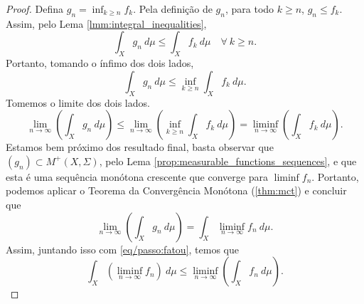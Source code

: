 \begin{proof}
    Defina $g_n=\inf_{k\geq n} f_k$. Pela definição de $g_n$, para todo $k\geq n$, $g_n\leq f_k$. Assim, pelo Lema \ref{lmm:integral_inequalities},
    \begin{equation*}
        \int_{X} g_n \ d\mu \leq \int_{X} f_k \ d\mu \quad \forall \ k\geq n.
    \end{equation*}
    Portanto, tomando o ínfimo dos dois lados,
    \begin{equation*}
        \int_{X} g_n \ d\mu \leq \inf_{k\geq n}\int_{X} f_k \ d\mu.
    \end{equation*}
    Tomemos o limite dos dois lados.
    \begin{equation}\label{eq/passo:fatou}
        \lim_{n\rightarrow \infty}\left(\int_{X} g_n \ d\mu\right) \leq \lim_{n\rightarrow \infty}\left(\inf_{k\geq n}\int_{X} f_k \ d\mu\right)=\liminf_{n\rightarrow\infty}\left(\int_{X} f_k \ d\mu\right) .
    \end{equation}
    Estamos bem próximo dos resultado final, basta observar que $(g_n)\subset M^{+}(X,\Sigma)$, pelo Lema \ref{prop:measurable_functions_sequences}, e que esta é uma sequência monótona crescente que converge para $\liminf f_n$. Portanto, podemos aplicar o Teorema da Convergência Monótona (\ref{thm:mct}) e concluir que
    \begin{equation*}
        \lim_{n\rightarrow\infty}\left(\int_{X} g_n \ d\mu\right) = \int_{X} \liminf_{n\rightarrow\infty} f_n \ d\mu.
    \end{equation*}
    Assim, juntando isso com \eqref{eq/passo:fatou}, temos que 
    \begin{equation*}
        \int_{X} \left(\liminf_{n\rightarrow \infty} f_n\right) \ d\mu \leq \liminf_{n\rightarrow \infty} \left( 
 \int_{X} f_n \ d\mu\right).
    \end{equation*}
\end{proof}